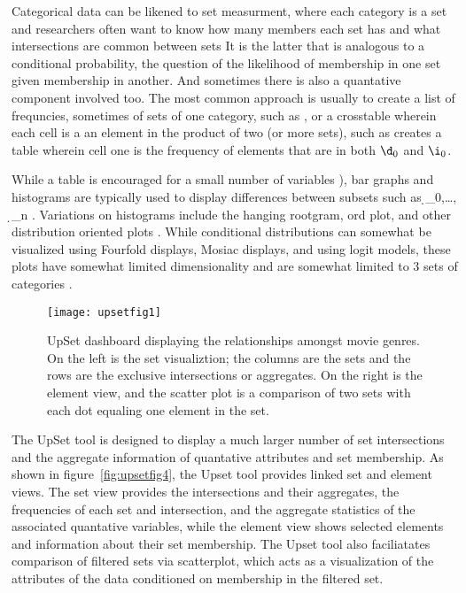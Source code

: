 \documentclass[../main.text]{subfiles}
\begin{document}
Categorical data can be likened to set measurment, where each category is a set
and researchers often want to know how many members each set has and what
intersections are common between sets \cite{agresti_categorical_2011,schneider_set-theoretic_2012}
  It is the latter that is analogous to a
conditional probability, the question of the likelihood of membership in one
set given membership in another. And sometimes there is also a quantative
component involved too. The most common approach is usually to create a list of frequncies, sometimes of sets of one category, such as \D, or a crosstable wherein each cell is a an element
 in the product of two (or more sets), such as \D\cross \I creates a table
 wherein cell one is the frequency of elements that are in both $\d_0$ and
 $\i_0$.

 While a table is encouraged for a small number of variables
 \cite{munznertablesgood}), bar graphs and histograms are typically used to display
 differences between subsets such as \d_0,\dots, \d_n
 \cite{ioannidis_history_2003-1, friendly_brief_2006}. Variations on histograms
 include the hanging rootgram, ord plot, and other distribution oriented
 plots \cite{tukey_exploratory_1977, friendly_visualizing_2000}. While conditional  distributions can somewhat be visualized using Fourfold displays, Mosiac displays, and using logit models, these plots have somewhat limited dimensionality and are somewhat limited to 3 sets of categories
 \cite{friendly_visualizing_2000}. 
   
 
 \begin{figure}
   \texttt{[image: upsetfig1]}
   \caption{UpSet dashboard displaying the relationships amongst movie
     genres. On the left is the set visualiztion; the columns are the sets and
     the rows are the exclusive intersections or aggregates. On the right is
     the element view, and the scatter plot is a comparison of two sets with
     each dot equaling one element in the set.}
   \label{fig:upsetfig1}
 \end{figure}

The UpSet tool is designed to
display a much larger number of set intersections and the aggregate
information of quantative attributes and set membership. \cite{lex_upset:_2014}
As shown in figure~\ref{fig:upsetfig4}, the Upset tool provides linked set and element views. The set view provides the intersections and their
aggregates, the frequencies of each set and intersection, and the aggregate
statistics of the associated quantative variables, while the element view shows
selected elements and information about their set membership. The Upset tool
also faciliatates comparison of filtered sets via scatterplot, which acts as a
visualization of the attributes of the data conditioned on membership in the
filtered set.  
\end{document}
